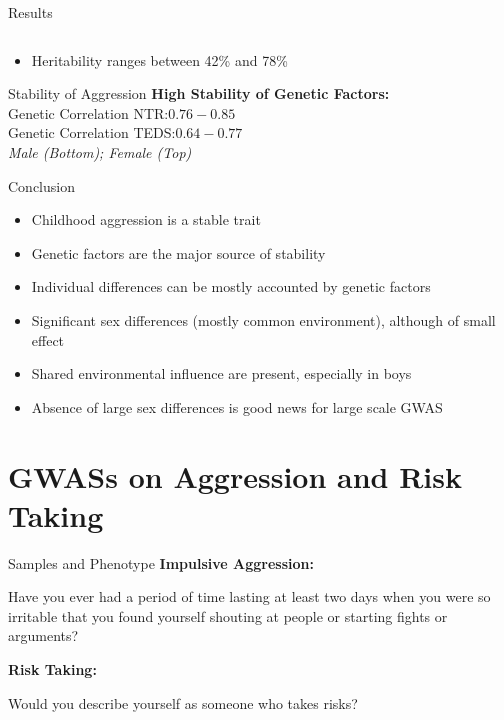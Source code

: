 \documentclass{beamer}
\begin{document}
\begin{frame}[t]{Results}
\begin{columns}
\begin{column}{0.5\textwidth}
\begin{center}
      \end{center} 
    \end{column}
  \end{columns}
  \begin{itemize}
    \item Heritability ranges between 42\% and 78\%
  \end{itemize}
\end{frame}

\begin{frame}[t]{Stability of Aggression}
  \textbf{High Stability of Genetic Factors:} \\
  Genetic Correlation NTR:\@ $0.76-0.85$ \\
  Genetic Correlation TEDS:\@ $0.64-0.77$ \\
  \vfill
  \vfill
  {\centering \textit{Male (Bottom); Female (Top)} }
\end{frame}

\begin{frame}[t]{Conclusion}
  \begin{itemize}
    \item Childhood aggression is a stable trait
    \item Genetic factors are the major source of stability
    \item Individual differences can be mostly accounted by genetic factors
    \item Significant sex differences (mostly common environment), although of small effect
    \item Shared environmental influence are present, especially in boys
    \item Absence of large sex differences is good news for large scale GWAS
  \end{itemize}	
\end{frame}

\section{GWASs on Aggression and Risk Taking}

\begin{frame}[t]{Samples and Phenotype}
  \small
  \textbf{Impulsive Aggression:}
  \begin{displayquote}
    Have you ever had a period of time lasting at least two days when you were so irritable that you found yourself shouting at people or starting fights or arguments?
  \end{displayquote}
  \textbf{Risk Taking:}
  \begin{displayquote}
    Would you describe yourself as someone who takes risks?
  \end{displayquote}
  \resizebox{\textwidth}{!}{}
\end{frame}
\end{document}
